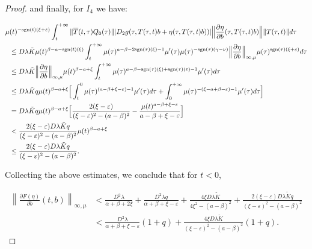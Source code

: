 \documentclass[9pt]{amsart}
\numberwithin{equation}{section}
\numberwithin{lemma}{section}
\begin{document}
\begin{proof}
and finally, for $I_4$ we have:

\begin{equation*}
    \begin{split}
        \mu&(t)^{-\textnormal{sgn}(t)(\xi+\varepsilon)}\int_{t}^{+\infty}\|\overline{T}(t,\tau)Q_0(\tau)\| |D_2g(\tau,T(\tau,t)b+\eta(\tau,T(\tau,t)b))| \Big\|\frac{\partial\eta}{\partial b}(\tau,T(\tau,t)b)\Big\| \|T(\tau,t)\|d\tau\\
        &\leq D\lambda\tilde{K}\mu(t)^{\beta-a-\textnormal{sgn}(t)(\xi)}\int_{t}^{+\infty}\mu(\tau)^{a-\beta-2\textnormal{sgn}(\tau)(\xi)-1}\mu'(\tau)\mu(\tau)^{-\textnormal{sgn}(\tau)(\gamma-\nu)}\Big\|\frac{\partial\eta}{\partial b}\Big\|_{\infty,\mu}\mu(\tau)^{\textnormal{sgn}(\tau)(\xi+\varepsilon)}d\tau\\
        &\leq D\lambda\tilde{K}\Big\|\frac{\partial\eta}{\partial b}\Big\|_{\infty,\mu}\mu(t)^{\beta-a+\xi}\int_{t}^{+\infty}\mu(\tau)^{a-\beta-\textnormal{sgn}(\tau)(\xi)+\textnormal{sgn}(\tau)(\varepsilon)-1}\mu'(\tau)d\tau\\
        &\leq D\lambda\tilde{K} q\mu(t)^{\beta-a+\xi}\Big[\int_{t}^{0}\mu(\tau)^{(a-\beta+\xi-\varepsilon)-1}\mu'(\tau)d\tau + \int_{0}^{+\infty}\mu(\tau)^{-(\xi-a+\beta-\varepsilon)-1}\mu'(\tau)d\tau\Big]\\
        &= D\lambda\tilde{K} q\mu(t)^{\beta-a+\xi}\Big[\frac{2(\xi-\varepsilon)}{(\xi-\varepsilon)^2-(a-\beta)^2}-\frac{\mu(t)^{a-\beta+\xi-\varepsilon}}{a-\beta+\xi-\varepsilon}\Big]\\
        &< \frac{2(\xi-\varepsilon)D\lambda\tilde{K}q}{(\xi-\varepsilon)^2-(a-\beta)^2}\mu(t)^{\beta-a+\xi}\\
        &\leq \frac{2(\xi-\varepsilon)D\lambda\tilde{K}q}{(\xi-\varepsilon)^2-(a-\beta)^2}.
    \end{split}
\end{equation*}

Collecting the above estimates, we conclude that for \(t < 0\),

\begin{align}
    \left\|\frac{\partial F(\eta)}{\partial b}(t,b)\right\|_{\infty,\mu} &< \frac{D^2\lambda}{\alpha+\beta+2\xi} + \frac{D^2\lambda q}{\alpha+\beta+\xi-\varepsilon} + \frac{4\xi D\lambda\tilde{K}}{4\xi^2-(a-\beta)^2} + \frac{2(\xi-\varepsilon)D\lambda\tilde{K}q}{(\xi-\varepsilon)^2-(a-\beta)^2}\nonumber\\
    &< \frac{D^2\lambda}{\alpha+\beta+\xi-\varepsilon}(1+q) + \frac{4\xi D\lambda\tilde{K}}{(\xi-\varepsilon)^2-(a-\beta)^2}(1+q).\label{DF-tmenorcero}
\end{align}


\end{proof}
\end{document}
